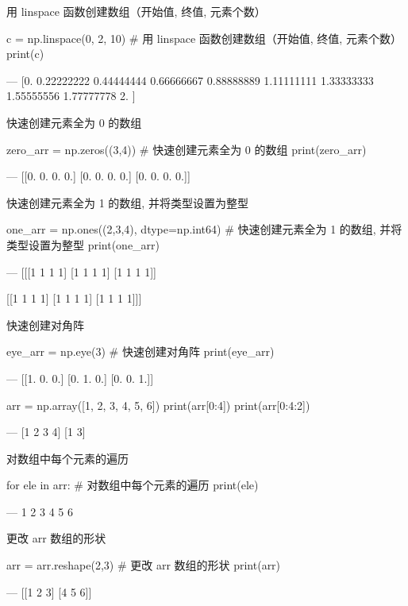 用 linspace 函数创建数组（开始值, 终值, 元素个数）

\begin{python}
c = np.linspace(0, 2, 10)   # 用 linspace 函数创建数组（开始值, 终值, 元素个数）
print(c)

---
[0.         0.22222222 0.44444444 0.66666667 0.88888889 1.11111111
 1.33333333 1.55555556 1.77777778 2.        ]
\end{python}

快速创建元素全为 0 的数组

\begin{python}
zero_arr = np.zeros((3,4))   # 快速创建元素全为 0 的数组
print(zero_arr)

---
[[0. 0. 0. 0.]
 [0. 0. 0. 0.]
 [0. 0. 0. 0.]]
\end{python}

快速创建元素全为 1 的数组, 并将类型设置为整型

\begin{python}
one_arr = np.ones((2,3,4), dtype=np.int64)   # 快速创建元素全为 1 的数组, 并将类型设置为整型
print(one_arr)

---
[[[1 1 1 1]
  [1 1 1 1]
  [1 1 1 1]]

 [[1 1 1 1]
  [1 1 1 1]
  [1 1 1 1]]]
\end{python}

快速创建对角阵 

\begin{python}
eye_arr = np.eye(3)   # 快速创建对角阵 
print(eye_arr)

---
[[1. 0. 0.]
 [0. 1. 0.]
 [0. 0. 1.]]
\end{python}

\begin{python}
arr = np.array([1, 2, 3, 4, 5, 6])
print(arr[0:4])      
print(arr[0:4:2])

---
[1 2 3 4]
[1 3]
\end{python}

对数组中每个元素的遍历

\begin{python}
for ele in arr:     # 对数组中每个元素的遍历
    print(ele)
    
---
1
2
3
4
5
6
\end{python}

更改 arr 数组的形状

\begin{python}
arr = arr.reshape(2,3)     # 更改 arr 数组的形状
print(arr)

---
[[1 2 3]
 [4 5 6]]
\end{python}

